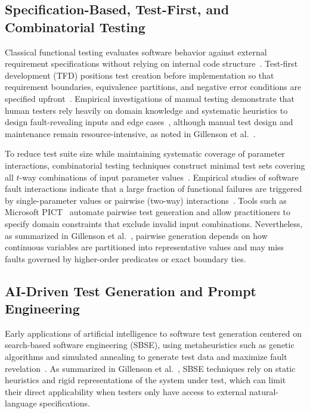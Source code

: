 \documentclass[acmsmall]{acmart}
\begin{document}
\subsection{Specification-Based, Test-First, and Combinatorial Testing}
Classical functional testing evaluates software behavior against external requirement specifications without relying on internal code structure~\cite{Burnstein2003, Myers2004, Bertolino2007}. Test-first development (TFD) positions test creation before implementation so that requirement boundaries, equivalence partitions, and negative error conditions are specified upfront~\cite{Beck2003}. Empirical investigations of manual testing demonstrate that human testers rely heavily on domain knowledge and systematic heuristics to design fault-revealing inputs and edge cases~\cite{Itkonen2013}, although manual test design and maintenance remain resource-intensive, as noted in Gillenson et al.~\cite{Gillenson2026}.

To reduce test suite size while maintaining systematic coverage of parameter interactions, combinatorial testing techniques construct minimal test sets covering all $t$-way combinations of input parameter values~\cite{Cohen1997, Nie2011}. Empirical studies of software fault interactions indicate that a large fraction of functional failures are triggered by single-parameter values or pairwise (two-way) interactions~\cite{Kuhn2004}. Tools such as Microsoft PICT~\cite{Czerwonka2008} automate pairwise test generation and allow practitioners to specify domain constraints that exclude invalid input combinations. Nevertheless, as summarized in Gillenson et al.~\cite{Gillenson2026}, pairwise generation depends on how continuous variables are partitioned into representative values and may miss faults governed by higher-order predicates or exact boundary ties.

\subsection{AI-Driven Test Generation and Prompt Engineering}
Early applications of artificial intelligence to software test generation centered on search-based software engineering (SBSE), using metaheuristics such as genetic algorithms and simulated annealing to generate test data and maximize fault revelation~\cite{Harman2001, McMinn2004}. As summarized in Gillenson et al.~\cite{Gillenson2026}, SBSE techniques rely on static heuristics and rigid representations of the system under test, which can limit their direct applicability when testers only have access to external natural-language specifications.
\end{document}
